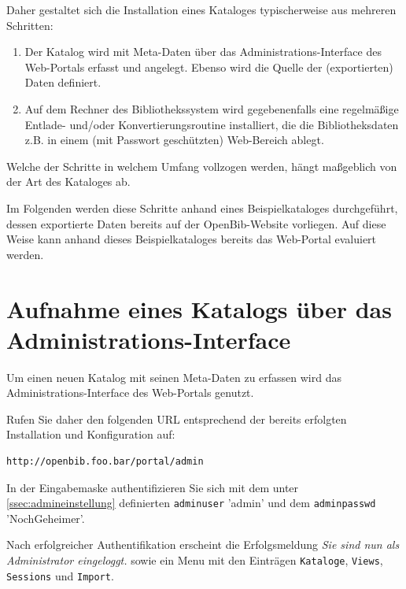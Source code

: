 \documentclass[11pt, twoside, a4paper, BCOR8mm, DIV12, bibtotoc,idxtotoc]{scrbook}
\begin{document}
Daher gestaltet sich die Installation eines Kataloges typischerweise
aus mehreren Schritten:

\begin{enumerate}
\item Der Katalog wird mit Meta-Daten über das
  Administrations-Interface des Web-Portals erfasst und
  angelegt. Ebenso wird die Quelle der (exportierten) Daten definiert.
\item Auf dem Rechner des Bibliothekssystem wird gegebenenfalls eine
  regelmäßige Entlade- und/oder Konvertierungsroutine installiert,
  die die Bibliotheksdaten z.B. in einem (mit Passwort geschützten)
  Web-Bereich ablegt.
\end{enumerate}

Welche der Schritte in welchem Umfang vollzogen werden, hängt
maßgeblich von der Art des Kataloges ab.

Im Folgenden werden diese Schritte anhand eines Beispielkataloges
durchgeführt, dessen exportierte Daten bereits auf der
OpenBib-Website vorliegen. Auf diese Weise kann anhand dieses
Beispielkataloges bereits das Web-Portal evaluiert werden.

\section{Aufnahme eines Katalogs über das Administrations-Interface}

Um einen neuen Katalog mit seinen Meta-Daten zu erfassen wird das
Administrations-Interface des Web-Portals genutzt.

Rufen Sie daher den folgenden URL entsprechend der bereits erfolgten
Installation und Konfiguration auf:

\begin{verbatim}
http://openbib.foo.bar/portal/admin
\end{verbatim}

In der Eingabemaske authentifizieren Sie sich mit dem unter
\ref{ssec:admineinstellung} definierten \texttt{adminuser} 'admin' und
dem \texttt{adminpasswd} 'NochGeheimer'.

Nach erfolgreicher Authentifikation erscheint die Erfolgsmeldung
\emph{Sie sind nun als Administrator eingeloggt.} sowie ein Menu mit
den Einträgen \texttt{Kataloge}, \texttt{Views},
\texttt{Sessions} und \texttt{Import}.
\end{document}
